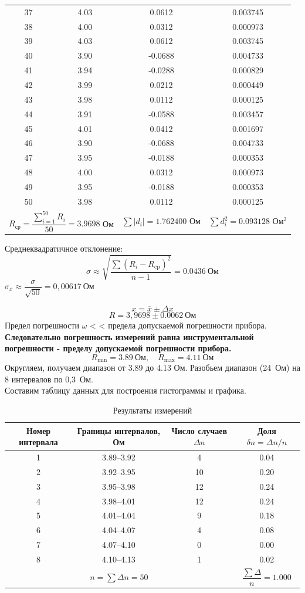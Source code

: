 \documentclass[14pt,a4paper]{extarticle}
\begin{document}
{\begin{longtable}{|c|c|c|c|}
37 & 4.03 & 0.0612 & 0.003745 \\
38 & 4.00 & 0.0312 & 0.000973 \\
39 & 4.03 & 0.0612 & 0.003745 \\
40 & 3.90 & -0.0688 & 0.004733 \\
41 & 3.94 & -0.0288 & 0.000829 \\
42 & 3.99 & 0.0212 & 0.000449 \\
43 & 3.98 & 0.0112 & 0.000125 \\
44 & 3.91 & -0.0588 & 0.003457 \\
45 & 4.01 & 0.0412 & 0.001697 \\
46 & 3.90 & -0.0688 & 0.004733 \\
47 & 3.95 & -0.0188 & 0.000353 \\
48 & 4.00 & 0.0312 & 0.000973 \\
49 & 3.95 & -0.0188 & 0.000353 \\
50 & 3.98 & 0.0112 & 0.000125 \\
\hline
\multicolumn{2}{|c|}{\(R_{\text{ср}} = \dfrac{\sum_{i=1}^{50} R_i}{50} = 3.9698\) Ом} & 
\(\sum |d_i| = 1.762400
\) Ом & 
\(\sum d_i^2 = 0.093128\) Ом\(^2\) \\
\hline
\end{longtable}
}
Среднеквадратичное отклонение:
\[
\sigma \approx \sqrt{\frac{\sum (R_i - R_{\text{cp}})^{2}}{n-1}} = 0.0436~\text{Ом}
\]
\( \sigma_{\bar{x}} \approx \dfrac{\sigma}{\sqrt{50}} = 0{,}00617~\text{Ом} \)

\[
x = \overline{x} \pm \Delta x
\]
\[
R = 3{,}9698 \pm 0.0062~\text{Ом}
\]
Предел погрешности  \(\omega\) < < предела допускаемой погрешности прибора.
\\\textbf{Следовательно погрешность измерений равна инструментальной погрешности - пределу допускаемой погрешности прибора.}
\[
R_{\text{min}} = 3.89~\text{Ом},\quad R_{\text{max}} = 4.11~\text{Ом}
\]
Округляем, получаем диапазон от 3.89 до 4.13 Ом. Разобьем диапазон (24~Ом) на 8 интервалов по 0,3~Ом.
\\Составим таблицу данных для построения гистограммы и графика.
\begin{table}[ht!]
\centering
\caption{Результаты измерений}
\label{tab:results}
\small
\begin{tabular}{|c|c|c|c|}
\hline
Номер интервала & Границы интервалов, Ом & Число случаев $\Delta n$ & Доля $\delta n = \Delta n / n$ \\
\hline
1  & 3.89–3.92 & 4  & 0.04 \\
2  & 3.92–3.95 & 10 & 0.20 \\
3  & 3.95–3.98 & 12 & 0.24 \\
4  & 3.98–4.01 & 12 & 0.24 \\
5  & 4.01–4.04 & 9  & 0.18 \\
6  & 4.04–4.07 & 4  & 0.08 \\
7  & 4.07–4.10 & 0  & 0.00 \\
8  & 4.10–4.13 & 1  & 0.02 \\
\hline
\multicolumn{3}{|c|}{$n = \sum \Delta n = 50$} & $\dfrac{\sum \Delta} n = 1.000$ \\
\hline
\end{tabular}
\end{table}
\newpage
\end{document}
